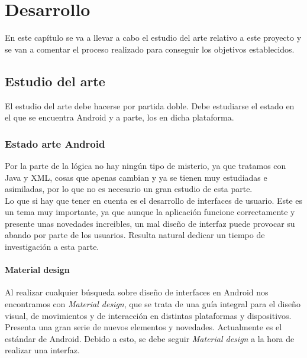 \chapter{Desarrollo}
\label{cap:desarrollo}

En este capítulo se va a llevar a cabo el estudio del arte relativo a este proyecto y se van a comentar el proceso realizado para conseguir los objetivos establecidos.

\section{Estudio del arte}

El estudio del arte debe hacerse por partida doble. Debe estudiarse el estado en el que se encuentra Android y a parte, los  en dicha plataforma.\\

\subsection{Estado arte Android}

Por la parte de la lógica no hay ningún tipo de misterio, ya que tratamos con Java y XML, cosas que apenas cambian y ya se tienen muy estudiadas e asimiladas, por lo que no es necesario un gran estudio de esta parte.\\

Lo que si hay que tener en cuenta es el desarrollo de interfaces de usuario. Este es un tema muy importante, ya que aunque la aplicación funcione correctamente y presente unas novedades increibles, un mal diseño de interfaz puede provocar su abando por parte de los usuarios. Resulta natural dedicar un tiempo de investigación a esta parte.\\

\subsubsection{Material design}
Al realizar cualquier búsqueda sobre diseño de interfaces en Android nos encontramos con \textit{Material design}, que se trata de una guía integral para el diseño visual, de movimientos y de interacción en distintas plataformas y dispositivos. Presenta una gran serie de nuevos elementos y novedades. Actualmente es el estándar de Android. Debido a esto, se debe seguir \textit{Material design} a la hora de realizar una interfaz.

